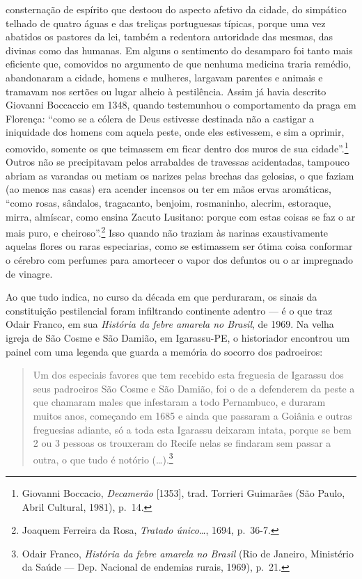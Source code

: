 consternação de espírito que destoou do aspecto afetivo da cidade, do
simpático telhado de quatro águas e das treliças portuguesas típicas,
porque uma vez abatidos os pastores da lei, também a redentora
autoridade das mesmas, das divinas como das humanas. Em alguns o
sentimento do desamparo foi tanto mais eficiente que, comovidos no
argumento de que nenhuma medicina traria remédio, abandonaram a cidade,
homens e mulheres, largavam parentes e animais e tramavam nos sertões ou
lugar alheio à pestilência. Assim já havia descrito Giovanni Boccaccio
em 1348, quando testemunhou o comportamento da praga em Florença: ``como
se a cólera de Deus estivesse destinada não a castigar a iniquidade dos
homens com aquela peste, onde eles estivessem, e sim a oprimir,
comovido, somente os que teimassem em ficar dentro dos muros de sua
cidade''.\footnote{Giovanni Boccacio, \textit{Decamerão} {[}1353{]}, trad.
  Torrieri Guimarães (São Paulo, Abril Cultural, 1981), p.~14.} Outros
não se precipitavam pelos arrabaldes de travessas acidentadas, tampouco
abriam as varandas ou metiam os narizes pelas brechas das gelosias, o
que faziam (ao menos nas casas) era acender incensos ou ter em mãos
ervas aromáticas, ``como rosas, sândalos, tragacanto, benjoim,
rosmaninho, alecrim, estoraque, mirra, almíscar, como ensina Zacuto
Lusitano: porque com estas coisas se faz o ar mais puro, e
cheiroso''.\footnote{Joaquem Ferreira da Rosa, \textit{Tratado
  único\ldots{}}, 1694, p.~36-7.} Isso quando não traziam às narinas
exaustivamente aquelas flores ou raras especiarias, como se estimassem
ser ótima coisa conformar o cérebro com perfumes para amortecer o vapor
dos defuntos ou o ar impregnado de vinagre.

Ao que tudo indica, no curso da década em que perduraram, os sinais da
constituição pestilencial foram infiltrando continente adentro --- é o
que traz Odair Franco, em sua \textit{História da febre amarela no
Brasil}, de 1969. Na velha igreja de São Cosme e São Damião, em
Igarassu-PE, o historiador encontrou um painel com uma legenda que
guarda a memória do socorro dos padroeiros:

\begin{quote}
Um dos especiais favores que tem recebido esta freguesia de Igarassu dos
seus padroeiros São Cosme e São Damião, foi o de a defenderem da peste a
que chamaram males que infestaram a todo Pernambuco, e duraram muitos
anos, começando em 1685 e ainda que passaram a Goiânia e outras
freguesias adiante, só a toda esta Igarassu deixaram intata, porque se
bem 2 ou 3 pessoas os trouxeram do Recife nelas se findaram sem passar a
outra, o que tudo é notório (\dots{}).\footnote{Odair Franco, \textit{História
  da febre amarela no Brasil} (Rio de Janeiro, Ministério da Saúde ---
  Dep. Nacional de endemias rurais, 1969), p.~21.}
\end{quote}

